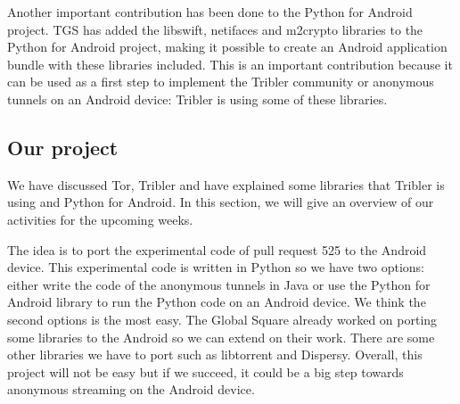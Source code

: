 		Another important contribution has been done to the Python for Android project. TGS has added the libswift, netifaces and m2crypto libraries to the Python for Android project, making it possible to create an Android application bundle with these libraries included. This is an important contribution because it can be used as a first step to implement the Tribler community or anonymous tunnels on an Android device: Tribler is using some of these libraries.
		
	\subsection{Our project}
		We have discussed Tor, Tribler and have explained some libraries that Tribler is using and Python for Android. In this section, we will give an overview of our activities for the upcoming weeks.
		
		The idea is to port the experimental code of pull request 525 to the Android device. This experimental code is written in Python so we have two options: either write the code of the anonymous tunnels in Java or use the Python for Android library to run the Python code on an Android device. We think the second options is the most easy. The Global Square already worked on porting some libraries to the Android so we can extend on their work. There are some other libraries we have to port such as libtorrent and Dispersy. Overall, this project will not be easy but if we succeed, it could be a big step towards anonymous streaming on the Android device.

